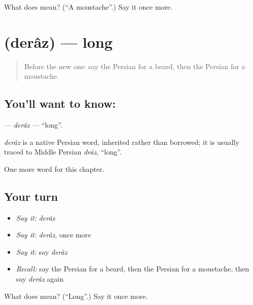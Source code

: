 \begin{tcolorbox}[breakable,colback=teal!4,colframe=teal!35!black,title={Before you move on}]
What does  mean? (\textquotedblleft{}A moustache\textquotedblright{}.) Say it once more.
\end{tcolorbox}
\section[\texorpdfstring{\fa{دراز} (derâz)}{دراز (derâz)}]{ (derâz) — long}

\label{lesson:FA-C123-deraz}



\begin{quote}
Before the new one: say the Persian for a beard, then the Persian for a moustache.
\end{quote}

\subsection*{You'll want to know: }
\textbf{} — \emph{derâz} — \textquotedblleft{}long\textquotedblright{}.

\begin{cousinweb}
\emph{derâz} is a native Persian word, inherited rather than borrowed; it is usually traced to Middle Persian \emph{drāz}, \textquotedblleft{}long\textquotedblright{}.
\end{cousinweb}

\begin{grammarlens}[title={What you've built}]
One more word for this chapter.
\end{grammarlens}

\subsection*{Your turn}
\begin{itemize}
\raggedright
  \item \emph{Say it:} \emph{derâz}
  \item \emph{Say it:} \emph{derâz}, once more
  \item \emph{Say it:} say \emph{derâz}
  \item \emph{Recall:} say the Persian for a beard, then the Persian for a moustache, then say \emph{derâz} again
\end{itemize}

\begin{tcolorbox}[breakable,colback=teal!4,colframe=teal!35!black,title={Before you move on}]
What does  mean? (\textquotedblleft{}Long\textquotedblright{}.) Say it once more.
\end{tcolorbox}
